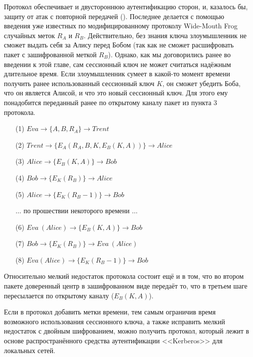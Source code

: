 Протокол обеспечивает и двустороннюю аутентификацию сторон, и, казалось бы, защиту от атак с повторной передачей (). Последнее делается с помощью введения уже известных по модифицированному протоколу Wide-Mouth Frog случайных меток $R_A$ и $R_B$. Действительно, без знания ключа злоумышленник не сможет выдать себя за Алису перед Бобом (так как не сможет расшифровать пакет с зашифрованной меткой $R_B$). Однако, как мы договорились ранее во введении к этой главе, сам сессионный ключ не может считаться надёжным длительное время. Если злоумышленник сумеет в какой-то момент времени получить ранее использованный сессионный ключ $K$, он сможет убедить Боба, что он является Алисой, и что это новый сессионный ключ. Для этого ему понадобится переданный ранее по открытому каналу пакет из пункта 3 протокола.

\begin{itemize}
	\item[(1)] $ Eva \to \{ A, B, R_A \} \to Trent $
	\item[(2)] $ Trent \to \{ E_A \left( R_A, B, K, E_B \left( K, A \right) \right) \}	\to Alice $
	\item[(3)] $ Alice \to \{ E_B \left( K, A \right) \} \to Bob $
	\item[(4)] $ Bob \to \{ E_K \left( R_B \right) \} \to Alice $
	\item[(5)] $ Alice \to \{ E_K \left( R_B - 1 \right) \} \to Bob $
	\item[{}]  $\dots$ по прошествии некоторого времени $\dots$
	\item[(6)] $ Eva~(Alice) \to \{ E_B \left( K, A \right) \} \to Bob $
	\item[(7)] $ Bob \to \{ E_K \left( R_B \right) \} \to Eva~(Alice) $
	\item[(8)] $ Eva (Alice) \to \{ E_K \left( R_B - 1 \right) \} \to Bob $
\end{itemize}

Относительно мелкий недостаток протокола состоит ещё и в том, что во втором пакете доверенный центр в зашифрованном виде передаёт то, что в третьем шаге пересылается по открытому каналу ($E_B \left( K, A \right)$).

Если в протокол добавить метки времени, тем самым ограничив время возможного использования сессионного ключа, а также исправить мелкий недостаток с двойным шифрованием, можно получить протокол, который лежит в основе распространённого средства аутентификации <<Kerberos>> для локальных сетей.


